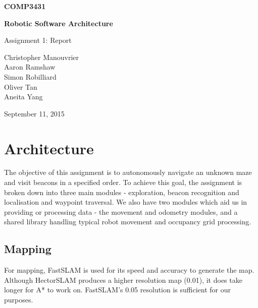 \documentclass[titlepage,12pt,a4paper]{article}
\begin{document}
\begin{titlepage}
    \begin{center}
        \vspace*{3cm}
        
        \Huge
        \textbf{COMP3431\\}
        \title{}
        \vspace{0.5cm}
        \Huge
        \textbf{Robotic Software Architecture}
        
        \vspace{0.54cm}
        
        \Large
        Assignment 1: Report
        
        \vspace{5cm}

	\normalsize
	Christopher Manouvrier\\
	Aaron Ramshaw\\
	Simon Robilliard\\
	Oliver Tan\\
	Aneita Yang
        
	\vfill
        
        \Large
        September 11, 2015
        
    \end{center}
\end{titlepage}

\pagebreak
\tableofcontents

\pagebreak
\section{Architecture}
The objective of this assignment is to autonomously navigate an unknown maze and visit beacons in a specified order. To achieve this goal, the assignment is broken down into three main modules - exploration, beacon recognition and localisation and waypoint traversal. We also have two modules which aid us in providing or processing data - the movement and odometry modules, and a shared library handling typical robot movement and occupancy grid processing.

\subsection{Mapping}
For mapping, FastSLAM is used for its speed and accuracy to generate the map. Although HectorSLAM produces a higher resolution map (0.01), it does take longer for A* to work on. FastSLAM's 0.05 resolution is sufficient for our purposes.
\end{document}
